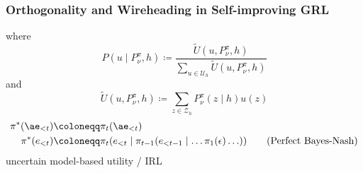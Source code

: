 \documentclass[UTF8,11pt,colorlinks,compress,openany]{beamer}%
\begin{document}
\begin{frame}\frametitle{Orthogonality and Wireheading in Self-improving GRL}
\begin{block}{}
\end{block}
where
\[P(u\mid P_\nu^\pi,h)\coloneqq \frac{\tilde{U}(u,P_\nu^\pi,h)}{\sum\limits_{u\in\mathcal{U}_h}\tilde{U}(u,P_\nu^\pi,h)}\]
and
\[\tilde{U}(u,P_\nu^\pi,h)\coloneqq \sum\limits_{z\in\mathcal{Z}_h}P_\nu^\pi(z\mid h)u(z)\]
\begin{align*}
\pi^*(\ae_{<t})&\coloneqq \pi_t(\ae_{<t})\\
\pi^*(e_{<t})&\coloneqq \pi_t(e_{<t}\mid \pi_{t-1}(e_{<t-1}\mid \ldots \pi_1(\epsilon)\ldots))\tag{Perfect Bayes-Nash}
\end{align*}
\centering uncertain model-based utility / IRL
\end{frame}
\end{document}

